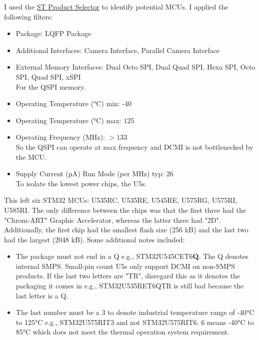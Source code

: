 I used the \href{https://www.st.com/content/st_com/en/stm32-mcu-product-selector.html}{ST Product Selector} to identify potential MCUs. I applied the following filters:
\begin{itemize}
    \item Package: LQFP Package
    \item Additional Interfaces: Camera Interface, Parallel Camera Interface
    \item External Memory Interfaces: Dual Octo SPI, Dual Quad SPI, Hexa SPI, Octo SPI, Quad SPI, xSPI \\
    For the QSPI memory.
    \item Operating Temperature (°C) min: -40
    \item Operating Temperature (°C) max: 125
    \item Operating Frequency (MHz): $> 133$ \\
    So the QSPI can operate at max frequency and DCMI is not bottlenecked by the MCU.
    \item Supply Current (µA) Run Mode (per MHz) typ: 26 \\
    To isolate the lowest power chips, the U5s.
\end{itemize}

This left six STM32 MCUs: U535RC, U535RE, U545RE, U575RG, U575RI, U585RI. The only difference between the chips was that the first three had the "Chrom-ART" Graphic Accelerator, whereas the latter three had "2D". Additionally, the first chip had the smallest flash size (256 kB) and the last two had the largest (2048 kB). Some additional notes included:

\begin{itemize}
    \item The package must not end in a Q e.g., STM32U545CET6\textbf{Q}. The Q denotes internal SMPS. Small-pin count U5s only support DCMI on non-SMPS products. If the last two letters are "TR", disregard this as it denotes the packaging it comes in e.g., STM32U535RET6QTR is still bad because the last letter is a Q.
    \item The last number must be a 3 to denote industrial temperature range of -40°C to 125°C e.g., STM32U575RIT3 and not STM32U575RIT6. 6 means -40°C to 85°C which does not meet the thermal operation system requirement.
\end{itemize}

